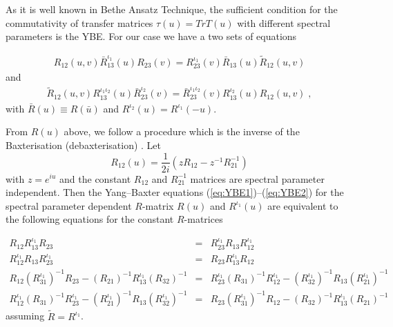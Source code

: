 \documentclass[a4paper,a4paper]{article}
\begin{document}
\indent

As it is well known in Bethe Ansatz Technique, the sufficient
condition for the commutativity of transfer matrices $\tau(u)=
Tr T(u)$ with different spectral parameters is the YBE. For our
case we have a two sets of equations \cite{APSS}

\begin{eqnarray}
  \label{eq:YBE1}
  R_{12}(u,v) \bar{R}_{13}^{\iota_1}(u) R_{23}(v)=
  R_{23}^{\iota_1}(v) \bar{R}_{13}(u) \tilde{R}_{12}(u,v)
\end{eqnarray}
and
\begin{eqnarray}
  \label{eq:YBE2}
  \tilde{R}_{12}(u,v) R_{13}^{\iota_1 \iota_2}(u) 
  \bar{R}_{23}^{\iota_2}(v)=
  \bar{R}_{23}^{\iota_1 \iota_2}(v) R_{13}^{\iota_2}(u) R_{12}(u,v) \;,
\end{eqnarray}
with $\bar{R}(u)\equiv R(\bar{u})$ and $R^{\iota_2}(u)=R^{\iota_1}(-u)$.

From $R(u)$ above, we  follow a procedure which is the inverse of
the Baxterisation (debaxterisation) \cite{Jones}.  
Let 
\begin{equation}
  \label{eq:deBaxterise}
  R_{12}(u) = \frac{1}{2i} \left(z R_{12} - z^{-1} R_{21}^{-1} \right)
\end{equation}
with $z=e^{iu}$ and the constant $R_{12}$ and $R_{21}^{-1}$ matrices are
spectral parameter independent. Then the Yang--Baxter equations 
(\ref{eq:YBE1})--(\ref{eq:YBE2})
for the spectral parameter dependent $R$-matrix $R(u)$ and
$R^{\iota_1}(u)$ are
equivalent to the following equations for the constant $R$-matrices

\begin{eqnarray}
  \label{eq:YBEconst1}
  R_{12} R_{13}^{\iota_1} R_{23} &=&
  R_{23}^{\iota_1} R_{13} R_{12}^{\iota_1} \\
  \label{eq:YBEconst2}
  R_{12}^{\iota_1} R_{13} R_{23}^{\iota_1} &=&
  R_{23} R_{13}^{\iota_1} R_{12} \\
  \label{eq:YBEconst3}
  R_{12} \left(R_{31}^{\iota_1}\right)^{-1} R_{23} 
  - \left(R_{21}\right)^{-1} R_{13}^{\iota_1} \left(R_{32}\right)^{-1} &=&
  R_{23}^{\iota_1} \left(R_{31}\right)^{-1} R_{12}^{\iota_1} 
  - \left(R_{32}^{\iota_1}\right)^{-1} R_{13}
  \left(R_{21}^{\iota_1}\right)^{-1}  \\
  \label{eq:YBEconst4}
  R_{12}^{\iota_1} \left(R_{31}\right)^{-1} R_{23}^{\iota_1} 
  - \left(R_{21}^{\iota_1}\right)^{-1} R_{13}
  \left(R_{32}^{\iota_1}\right)^{-1} &=& 
  R_{23} \left(R_{31}^{\iota_1}\right)^{-1} R_{12} 
  - \left(R_{32}\right)^{-1} R_{13}^{\iota_1} \left(R_{21}\right)^{-1} 
\end{eqnarray}
assuming $\tilde{R} = R^{\iota_1}$. 
\end{document}

